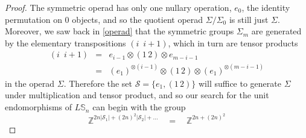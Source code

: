 \documentclass{amsbook} %
\numberwithin{section}{chapter}
\begin{document}
\begin{proof}
The symmetric operad has only one nullary operation, $e_0$, the identity permutation on 0 objects, and so the quotient operad $\Sigma/\Sigma_0$ is still just $\Sigma$. Moreover, we saw back in \cref{operad} that the symmetric groups $\Sigma_m$ are generated by the elementary transpositions $(i \, \, \, i+1)$, which in turn are tensor products
\[ \begin{array}{rll}
			(i \, \, \,  i+1) & = & e_{i-1} \otimes (1 \, 2) \otimes e_{m-i-1} \\
			& = & (e_1)^{\otimes (i-1)} \otimes (1 \, 2) \otimes (e_1)^{\otimes (m-i-1)}
		\end{array}
\]
in the operad $\Sigma$. Therefore the set $\mathcal{S} = \{ e_1, (1 \, 2) \}$ will suffice to generate $\Sigma$ under multiplication and tensor product, and so our search for the unit endomorphisms of $L\mathbb{S}_n$ can begin with the group
\[ \mathbb{Z}^{2n|\mathcal{S}_1| + (2n)^2|\mathcal{S}_2| + ...}  \quad = \quad \mathbb{Z}^{2n + (2n)^2} \]


\end{proof}
\end{document}
